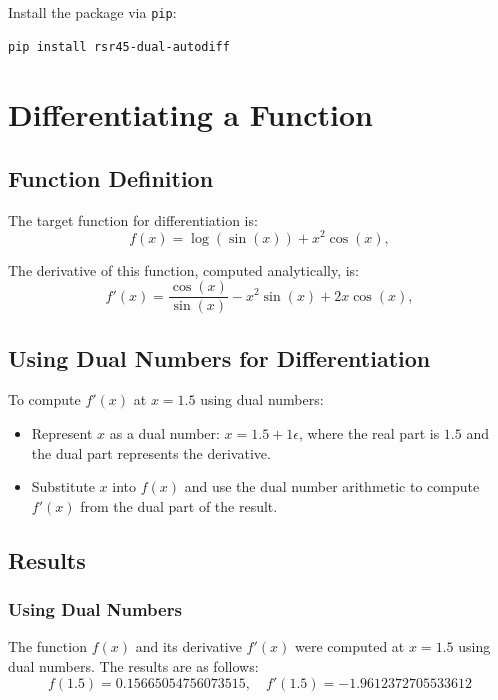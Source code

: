 \documentclass[a4paper,12pt]{article}
\begin{document}
Install the package via \texttt{pip}:
\begin{verbatim}
pip install rsr45-dual-autodiff
\end{verbatim}

\section{Differentiating a Function}

\subsection{Function Definition}
The target function for differentiation is:
\begin{equation}
    f(x) = \log(\sin(x)) + x^2 \cos(x),
    \label{eq:function_definition}
    \end{equation}
    
The derivative of this function, computed analytically, is:
\begin{equation}
    f'(x) = \frac{\cos(x)}{\sin(x)} -x^2 \sin(x) + 2x \cos(x),
    \label{eq:function_derivative}
    \end{equation}
    

\subsection{Using Dual Numbers for Differentiation}
To compute \(f'(x)\) at \(x = 1.5\) using dual numbers:
\begin{itemize}
    \item Represent \(x\) as a dual number: \(x = 1.5 + 1\epsilon\), where the real part is \(1.5\) and the dual part represents the derivative.
    \item Substitute \(x\) into \(f(x)\) and use the dual number arithmetic to compute \(f'(x)\) from the dual part of the result.
\end{itemize}

\subsection{Results}

\subsubsection{Using Dual Numbers}
The function \(f(x)\) and its derivative \(f'(x)\) were computed at \(x = 1.5\) using dual numbers. The results are as follows:
\[
f(1.5) = 0.15665054756073515, \quad f'(1.5) = -1.9612372705533612
\]
\end{document}
